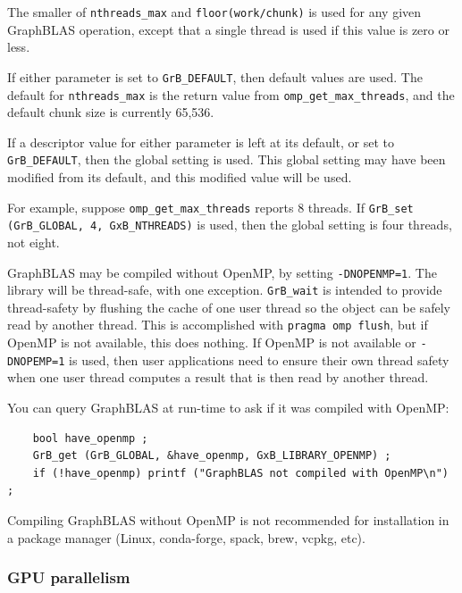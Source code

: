 The smaller of \verb'nthreads_max' and \verb'floor(work/chunk)' is used for any
given GraphBLAS operation, except that a single thread is used if this value is
zero or less.

If either parameter is set to \verb'GrB_DEFAULT', then default values are used.
The default for \verb'nthreads_max' is the return value from
\verb'omp_get_max_threads', and the default chunk size is currently 65,536.

If a descriptor value for either parameter is left at its default, or set to
\verb'GrB_DEFAULT', then the global setting is used.  This global setting may
have been modified from its default, and this modified value will be used.

For example, suppose \verb'omp_get_max_threads' reports 8 threads.  If \newline
\verb'GrB_set (GrB_GLOBAL, 4, GxB_NTHREADS)' is used, then the global setting is four
threads, not eight.

GraphBLAS may be compiled without OpenMP, by setting \verb'-DNOPENMP=1'.
The library will be thread-safe, with one exception.  \verb'GrB_wait' is
intended to provide thread-safety by flushing the cache of one user thread
so the object can be safely read by another thread.  This is accomplished
with \verb'pragma omp flush', but if OpenMP is not available, this does
nothing.  If OpenMP is not available or \verb'-DNOPEMP=1' is used, then
user applications need to ensure their own thread safety when one user thread
computes a result that is then read by another thread.

You can query GraphBLAS at run-time to ask if it was compiled with OpenMP:

{\small
\begin{verbatim}
    bool have_openmp ;
    GrB_get (GrB_GLOBAL, &have_openmp, GxB_LIBRARY_OPENMP) ;
    if (!have_openmp) printf ("GraphBLAS not compiled with OpenMP\n") ; \end{verbatim}}

Compiling GraphBLAS without OpenMP is not recommended for installation in a
package manager (Linux, conda-forge, spack, brew, vcpkg, etc).

\subsubsection{GPU parallelism}
\label{gpu_parallelism}

